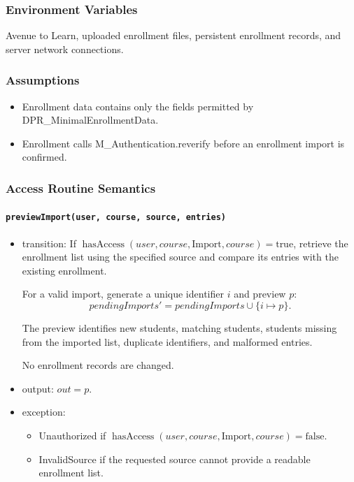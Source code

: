 \documentclass[12pt, titlepage]{article}
\begin{document}
\subsubsection{Environment Variables}

Avenue to Learn, uploaded enrollment files, persistent enrollment records, and server network connections.

\subsubsection{Assumptions}

\begin{itemize}
    \item Enrollment data contains only the fields permitted by DPR\_MinimalEnrollmentData.
    \item Enrollment calls M\_Authentication.reverify before an enrollment import is confirmed.
\end{itemize}

\subsubsection{Access Routine Semantics}

\paragraph{\texttt{previewImport(user, course, source, entries)}}
\begin{itemize}
    \item transition: If $\operatorname{hasAccess}(user,course,\text{Import},course)=\text{true}$, retrieve the enrollment list using the specified source and compare its entries with the existing enrollment.

    For a valid import, generate a unique identifier
    $i$ and preview $p$:
    \[
    \mathit{pendingImports}' =
    \mathit{pendingImports}
    \cup\{i\mapsto p\}.
    \]

    The preview identifies new students, matching students, students missing from the imported list, duplicate identifiers, and malformed entries.

    No enrollment records are changed.

    \item output: $out=p$.

    \item exception:
    \begin{itemize}
        \item Unauthorized if $\operatorname{hasAccess}(user,course,\text{Import},course)=\text{false}$.
        \item InvalidSource if the requested source cannot provide a readable enrollment list.
    \end{itemize}
\end{itemize}
\end{document}
